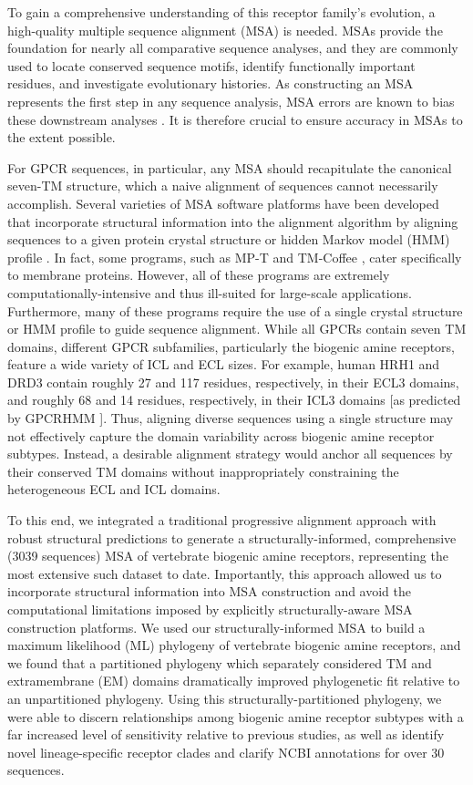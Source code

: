 \documentclass[fleqn,10pt]{wlpeerj}
\begin{document}
To gain a comprehensive understanding of this receptor family's evolution, a high-quality multiple sequence alignment (MSA) is needed. MSAs provide the foundation for nearly all comparative sequence analyses, and they are commonly used to locate conserved sequence motifs, identify functionally important residues, and investigate evolutionary histories. As constructing an MSA represents the first step in any sequence analysis, MSA errors are known to bias these downstream analyses \citep{Ogden2006, Wong2008, Jordan2012}. It is therefore crucial to ensure accuracy in MSAs to the extent possible. 

For GPCR sequences, in particular, any MSA should recapitulate the canonical seven-TM structure, which a naive alignment of sequences cannot necessarily accomplish. Several varieties of MSA software platforms have been developed that incorporate structural information into the alignment algorithm by aligning sequences to a given protein crystal structure \citep{promals3d, 3dcoffee} or hidden Markov model (HMM) profile \citep{hmmer, Chang2012, Hill2012}. In fact, some programs, such as MP-T \citep{Hill2012} and TM-Coffee \citep{Chang2012}, cater specifically to membrane proteins. However, all of these programs are extremely computationally-intensive and thus ill-suited for large-scale applications. Furthermore, many of these programs require the use of a single crystal structure or HMM profile to guide sequence alignment. While all GPCRs contain seven TM domains, different GPCR subfamilies, particularly the biogenic amine receptors, feature a wide variety of ICL and ECL sizes. For example, human HRH1 and DRD3 contain roughly 27 and 117 residues, respectively, in their ECL3 domains, and roughly 68 and 14 residues, respectively, in their ICL3 domains [as predicted by GPCRHMM \citep{Wistrand2006}]. Thus, aligning diverse sequences using a single structure may not effectively capture the domain variability across biogenic amine receptor subtypes. Instead, a desirable alignment strategy would anchor all sequences by their conserved TM domains without inappropriately constraining the heterogeneous ECL and ICL domains.

To this end, we integrated a traditional progressive alignment approach with robust structural predictions to generate a structurally-informed, comprehensive (3039 sequences) MSA of vertebrate biogenic amine receptors, representing the most extensive such dataset to date. Importantly, this approach allowed us to incorporate structural information into MSA construction and avoid the computational limitations imposed by explicitly structurally-aware MSA construction platforms. We used our structurally-informed MSA to build a maximum likelihood (ML) phylogeny of vertebrate biogenic amine receptors, and we found that a partitioned phylogeny which separately considered TM and extramembrane (EM) domains dramatically improved phylogenetic fit relative to an unpartitioned phylogeny. Using this structurally-partitioned phylogeny, we were able to discern relationships among biogenic amine receptor subtypes with a far increased level of sensitivity relative to previous studies, as well as identify novel lineage-specific receptor clades and clarify NCBI annotations for over 30 sequences.
\end{document}
